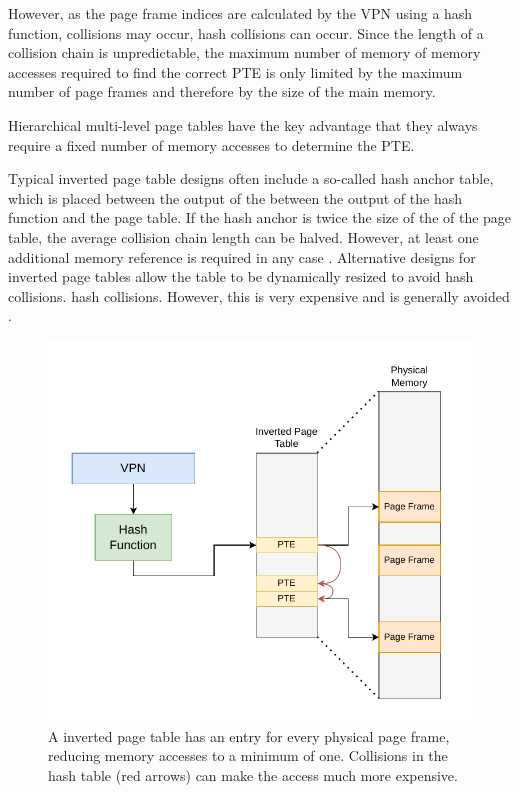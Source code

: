 However, as the page frame indices are calculated by the VPN using a hash function, collisions may occur,
hash collisions can occur. Since the length of a collision chain is unpredictable, the maximum number of memory
of memory accesses required to find the correct PTE is only limited by the maximum number of
page frames and therefore by the size of the main memory.

Hierarchical multi-level page tables have the key advantage that they always require
a fixed number of memory accesses to determine the PTE.

Typical inverted page table designs often include a so-called hash anchor table, which is placed between the output of the
between the output of the hash function and the page table. If the hash anchor is twice the size of the
of the page table, the average collision chain length can be halved.
However, at least one additional memory reference is required in any case \cite{jacob1998virtualissues}.
Alternative designs for inverted page tables allow the table to be dynamically resized to avoid hash collisions.
hash collisions. However, this is very expensive and is generally avoided \cite{skarlatos2020elastic}.

\begin{figure}[t]
    \centering
    \includegraphics[scale=1]{figures/inverted_pt.pdf}
    \caption[Simple Inverted Page Table Design]{A inverted page table has an entry for every physical
        page frame, reducing memory accesses to a minimum of one. Collisions in the hash table (red arrows) can
        make the access much more expensive. }
    \label{fig:fund:inverted}
\end{figure}

